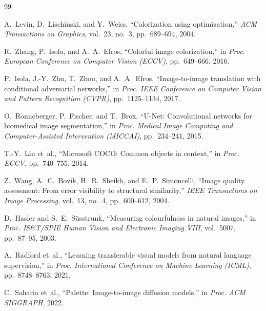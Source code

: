 \documentclass[11pt,a4paper]{article}
\begin{document}

\begin{thebibliography}{99}

A.~Levin, D.~Lischinski, and Y.~Weiss,
``Colorization using optimization,''
\textit{ACM Transactions on Graphics}, vol.~23, no.~3, pp.~689--694, 2004.

R.~Zhang, P.~Isola, and A.~A.~Efros,
``Colorful image colorization,''
in \textit{Proc. European Conference on Computer Vision (ECCV)}, pp.~649--666, 2016.

P.~Isola, J.-Y.~Zhu, T.~Zhou, and A.~A.~Efros,
``Image-to-image translation with conditional adversarial networks,''
in \textit{Proc. IEEE Conference on Computer Vision and Pattern Recognition (CVPR)}, pp.~1125--1134, 2017.

O.~Ronneberger, P.~Fischer, and T.~Brox,
``U-Net: Convolutional networks for biomedical image segmentation,''
in \textit{Proc. Medical Image Computing and Computer-Assisted Intervention (MICCAI)}, pp.~234--241, 2015.

T.-Y.~Lin et~al.,
``Microsoft COCO: Common objects in context,''
in \textit{Proc. ECCV}, pp.~740--755, 2014.

Z.~Wang, A.~C.~Bovik, H.~R.~Sheikh, and E.~P.~Simoncelli,
``Image quality assessment: From error visibility to structural similarity,''
\textit{IEEE Transactions on Image Processing}, vol.~13, no.~4, pp.~600--612, 2004.

D.~Hasler and S.~E.~Süsstrunk,
``Measuring colourfulness in natural images,''
in \textit{Proc. IS\&T/SPIE Human Vision and Electronic Imaging VIII}, vol.~5007, pp.~87--95, 2003.

A.~Radford et~al.,
``Learning transferable visual models from natural language supervision,''
in \textit{Proc. International Conference on Machine Learning (ICML)}, pp.~8748--8763, 2021.

C.~Saharia et~al.,
``Palette: Image-to-image diffusion models,''
in \textit{Proc. ACM SIGGRAPH}, 2022.

\end{thebibliography}
\end{document}
